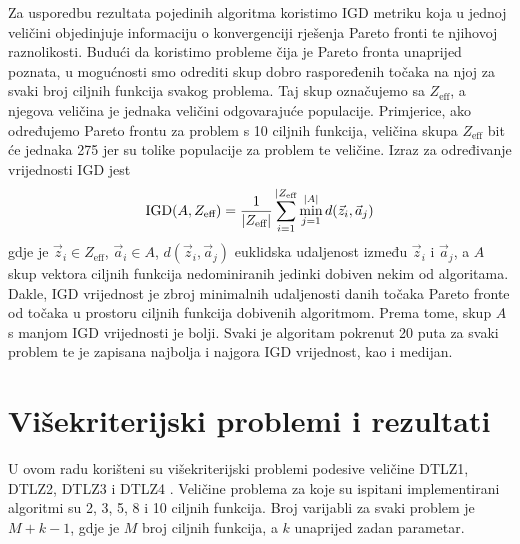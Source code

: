 \documentclass[times, utf8, zavrsni, numeric]{fer}
\begin{document}
Za usporedbu rezultata pojedinih algoritma koristimo IGD  metriku \citep{nsga3} koja u jednoj veličini objedinjuje informaciju o konvergenciji rješenja Pareto fronti te njihovoj raznolikosti. Budući da koristimo probleme čija je Pareto fronta unaprijed poznata, u mogućnosti smo odrediti skup dobro raspoređenih točaka na njoj za svaki broj ciljnih funkcija svakog problema. Taj skup označujemo sa $Z_{\text{eff}}$, a njegova veličina je jednaka	veličini odgovarajuće populacije. Primjerice, ako određujemo Pareto frontu za problem s 10 ciljnih funkcija, veličina skupa $Z_{\text{eff}}$ bit će jednaka 275 jer su tolike populacije za problem te veličine. Izraz za određivanje vrijednosti IGD jest
\begin{equation*}
\text{IGD}(A, Z_{\text{eff}}) = \frac{1}{\vert Z_{\text{eff}} \vert}\sum_{i = 1}^{\vert Z_{\text{eff}}} \min_{j = 1}^{\vert A \vert}{d(\vec{z}_i, \vec{a}_j)} \\
\end{equation*}
gdje je $\vec{z}_i \in Z_{\text{eff}}$, $ \vec{a}_i \in A$, $d(\vec{z}_i, \vec{a}_j)$ euklidska udaljenost između $\vec{z}_i$ i $\vec{a}_j$, a $A$ skup vektora ciljnih funkcija nedominiranih jedinki dobiven nekim od algoritama. Dakle, IGD vrijednost je zbroj minimalnih udaljenosti danih točaka Pareto fronte od točaka u prostoru ciljnih funkcija dobivenih algoritmom. Prema tome, skup $A$ s manjom IGD vrijednosti je bolji. Svaki je algoritam pokrenut 20 puta za svaki problem te je zapisana najbolja i najgora IGD vrijednost, kao i medijan. 
\section{Višekriterijski problemi i rezultati}
U ovom radu korišteni su višekriterijski problemi podesive veličine DTLZ1, DTLZ2, DTLZ3 i DTLZ4 \citep{dtlz}. Veličine problema za koje su ispitani implementirani algoritmi su 2, 3, 5, 8 i 10 ciljnih funkcija. Broj varijabli za svaki problem je $M + k - 1$, gdje je $M$ broj ciljnih funkcija, a $k$ unaprijed zadan parametar.
\end{document}
